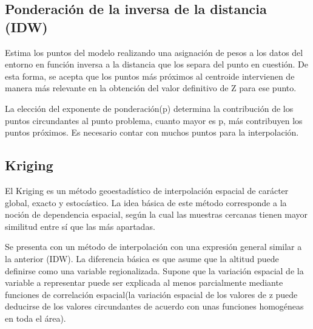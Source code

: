 \subsection{Ponderación de la inversa de la distancia (IDW)}
Estima los puntos del modelo realizando una asignación de pesos a los datos del entorno en función inversa a la
distancia que los separa del punto en cuestión. De esta forma, se acepta que los puntos más próximos al centroide
intervienen de manera más relevante en la obtención del valor definitivo de Z para ese punto.

La elección del exponente de ponderación(p) determina la contribución de los puntos circundantes al punto 
problema, cuanto mayor es p, más contribuyen los puntos próximos. Es necesario contar con muchos puntos para la
interpolación.

\subsection{Kriging}
El Kriging es un método geoestadístico de interpolación espacial de carácter global, exacto y estocástico. La 
idea básica de este método corresponde a la noción de dependencia espacial, según la cual las muestras cercanas
tienen mayor similitud entre sí que las más apartadas\cite{NINO2011}.

Se presenta con un método de interpolación con una expresión general similar a la anterior (IDW). La diferencia
básica es que asume que la altitud puede definirse como una variable regionalizada. Supone que la variación
espacial de la variable a representar puede ser explicada al menos parcialmente mediante funciones de correlación
espacial(la variación espacial de los valores de z puede deducirse de los valores circundantes de acuerdo con unas
funciones homogéneas en toda el área).
